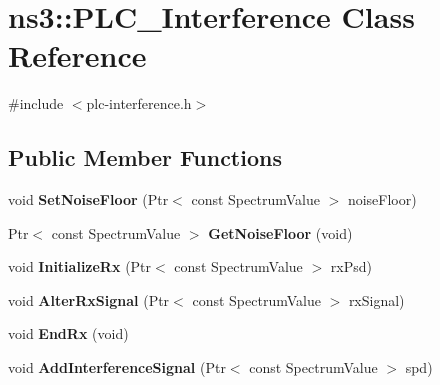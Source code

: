 \hypertarget{classns3_1_1PLC__Interference}{\section{ns3\-:\-:\-P\-L\-C\-\_\-\-Interference \-Class \-Reference}
\label{classns3_1_1PLC__Interference}
}


{\ttfamily \#include $<$plc-\/interference.\-h$>$}

\subsection*{\-Public \-Member \-Functions}
\begin{DoxyCompactItemize}
\item 
\hypertarget{classns3_1_1PLC__Interference_a627130812a35d6a0457c29886ab3aa65}{void {\bfseries \-Set\-Noise\-Floor} (\-Ptr$<$ const \-Spectrum\-Value $>$ noise\-Floor)}\label{classns3_1_1PLC__Interference_a627130812a35d6a0457c29886ab3aa65}

\item 
\hypertarget{classns3_1_1PLC__Interference_a4677a5ae77a5f51bcef95191c8a9e727}{\-Ptr$<$ const \-Spectrum\-Value $>$ {\bfseries \-Get\-Noise\-Floor} (void)}\label{classns3_1_1PLC__Interference_a4677a5ae77a5f51bcef95191c8a9e727}

\item 
\hypertarget{classns3_1_1PLC__Interference_a18b6be996768760513b0ee2e29710016}{void {\bfseries \-Initialize\-Rx} (\-Ptr$<$ const \-Spectrum\-Value $>$ rx\-Psd)}\label{classns3_1_1PLC__Interference_a18b6be996768760513b0ee2e29710016}

\item 
\hypertarget{classns3_1_1PLC__Interference_a4c8ea84010d1f097253693b0d9e35291}{void {\bfseries \-Alter\-Rx\-Signal} (\-Ptr$<$ const \-Spectrum\-Value $>$ rx\-Signal)}\label{classns3_1_1PLC__Interference_a4c8ea84010d1f097253693b0d9e35291}

\item 
\hypertarget{classns3_1_1PLC__Interference_a5b733c2fb32b0dc58938643a9adb9a41}{void {\bfseries \-End\-Rx} (void)}\label{classns3_1_1PLC__Interference_a5b733c2fb32b0dc58938643a9adb9a41}

\item 
\hypertarget{classns3_1_1PLC__Interference_aa9ed251d60d708accbbb88cadeaa2102}{void {\bfseries \-Add\-Interference\-Signal} (\-Ptr$<$ const \-Spectrum\-Value $>$ spd)}\label{classns3_1_1PLC__Interference_aa9ed251d60d708accbbb88cadeaa2102}


\end{DoxyCompactItemize}
